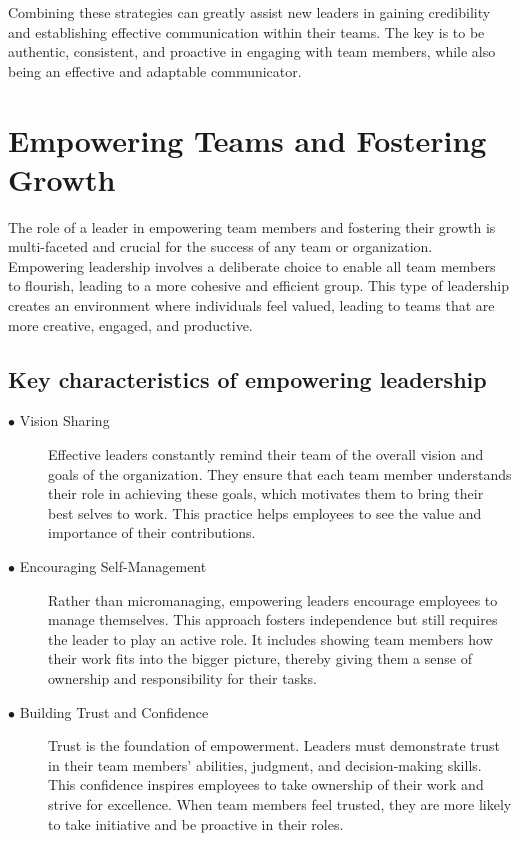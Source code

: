 \documentclass[runningheads]{llncs}
\begin{document}
Combining these strategies can greatly assist new leaders in gaining credibility and establishing effective communication within their teams. The key is to be authentic, consistent, and proactive in engaging with team members, while also being an effective and adaptable communicator.

\section{Empowering Teams and Fostering Growth}

The role of a leader in empowering team members and fostering their growth is multi-faceted and crucial for the success of any team or organization. Empowering leadership involves a deliberate choice to enable all team members to flourish, leading to a more cohesive and efficient group. This type of leadership creates an environment where individuals feel valued, leading to teams that are more creative, engaged, and productive.

\subsection{Key characteristics of empowering leadership}

\begin{description}
 \item [$\bullet$ Vision Sharing] Effective leaders constantly remind their team of the overall vision and goals of the organization. They ensure that each team member understands their role in achieving these goals, which motivates them to bring their best selves to work. This practice helps employees to see the value and importance of their contributions.\\

 \item [$\bullet$ Encouraging Self-Management] Rather than micromanaging, empowering leaders encourage employees to manage themselves. This approach fosters independence but still requires the leader to play an active role. It includes showing team members how their work fits into the bigger picture, thereby giving them a sense of ownership and responsibility for their tasks.\\

 \item [$\bullet$ Building Trust and Confidence] Trust is the foundation of empowerment. Leaders must demonstrate trust in their team members' abilities, judgment, and decision-making skills. This confidence inspires employees to take ownership of their work and strive for excellence. When team members feel trusted, they are more likely to take initiative and be proactive in their roles.\\
\end{description}
\end{document}
